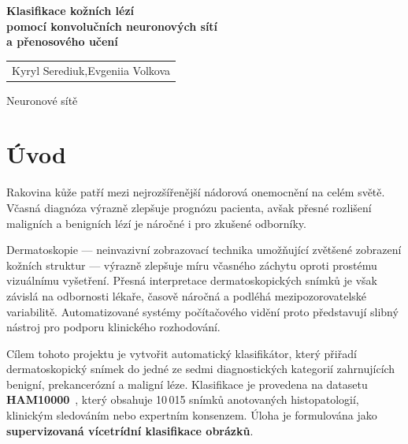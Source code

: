 \documentclass[12pt, a4paper]{article}
\begin{document}
\begin{titlepage}
    \centering
    \vspace*{2cm}

    {\LARGE\bfseries Klasifikace kožních lézí\\[0.4em]
    pomocí konvolučních neuronových sítí\\[0.4em]
    a přenosového učení\par}
    \vspace{1.5cm}
{\large
\begin{tabular}{c}
 Kyryl Serediuk,\quad Evgeniia Volkova \\[0.2em]
\end{tabular}\par}

{\normalsize Neuronové sítě \par}
\end{titlepage}

\tableofcontents
\newpage

\section{Úvod}
\label{sec:intro}

Rakovina kůže patří mezi nejrozšířenější nádorová onemocnění na celém světě.
Včasná diagnóza výrazně zlepšuje prognózu pacienta, avšak přesné rozlišení
maligních a benigních lézí je náročné i pro zkušené odborníky.

Dermatoskopie --- neinvazivní zobrazovací technika umožňující zvětšené
zobrazení kožních struktur --- výrazně zlepšuje míru včasného záchytu
oproti prostému vizuálnímu vyšetření. Přesná interpretace dermatoskopických
snímků je však závislá na odbornosti lékaře, časově náročná a podléhá
mezipozorovatelské variabilitě. Automatizované systémy počítačového vidění
proto představují slibný nástroj pro podporu klinického rozhodování.

Cílem tohoto projektu je vytvořit automatický klasifikátor, který přiřadí
dermatoskopický snímek do jedné ze sedmi diagnostických kategorií
zahrnujících benigní, prekancerózní a maligní léze. Klasifikace je provedena
na datasetu \textbf{HAM10000}~\cite{tschandl2018ham10000}, který obsahuje
10\,015 snímků anotovaných histopatologií, klinickým sledováním nebo
expertním konsenzem. Úloha je formulována jako
\textbf{supervizovaná vícetrídní klasifikace obrázků}.
\end{document}
